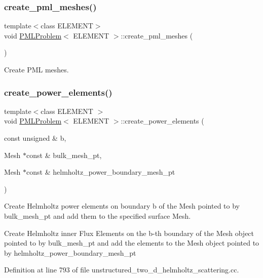 \subsubsection{\texorpdfstring{create\+\_\+pml\+\_\+meshes()}{create\_pml\_meshes()}\hspace{0.1cm}{\footnotesize\ttfamily [2/2]}}
{\footnotesize\ttfamily template$<$class E\+L\+E\+M\+E\+NT$>$ \\
void \hyperlink{classPMLProblem}{P\+M\+L\+Problem}$<$ E\+L\+E\+M\+E\+NT $>$\+::create\+\_\+pml\+\_\+meshes (\begin{DoxyParamCaption}{ }\end{DoxyParamCaption})}



Create P\+ML meshes. 

\mbox{\label{classPMLProblem_afcd6ccc306c79d30d998530c58328b85}} 
\subsubsection{\texorpdfstring{create\+\_\+power\+\_\+elements()}{create\_power\_elements()}}
{\footnotesize\ttfamily template$<$class E\+L\+E\+M\+E\+NT $>$ \\
void \hyperlink{classPMLProblem}{P\+M\+L\+Problem}$<$ E\+L\+E\+M\+E\+NT $>$\+::create\+\_\+power\+\_\+elements (\begin{DoxyParamCaption}\item[{const unsigned \&}]{b,  }\item[{Mesh $\ast$const \&}]{bulk\+\_\+mesh\+\_\+pt,  }\item[{Mesh $\ast$const \&}]{helmholtz\+\_\+power\+\_\+boundary\+\_\+mesh\+\_\+pt }\end{DoxyParamCaption})}



Create Helmholtz power elements on boundary b of the Mesh pointed to by bulk\+\_\+mesh\+\_\+pt and add them to the specified surface Mesh. 

Create Helmholtz inner Flux Elements on the b-\/th boundary of the Mesh object pointed to by bulk\+\_\+mesh\+\_\+pt and add the elements to the Mesh object pointed to by helmholtz\+\_\+power\+\_\+boundary\+\_\+mesh\+\_\+pt 

Definition at line 793 of file unstructured\+\_\+two\+\_\+d\+\_\+helmholtz\+\_\+scattering.\+cc.



